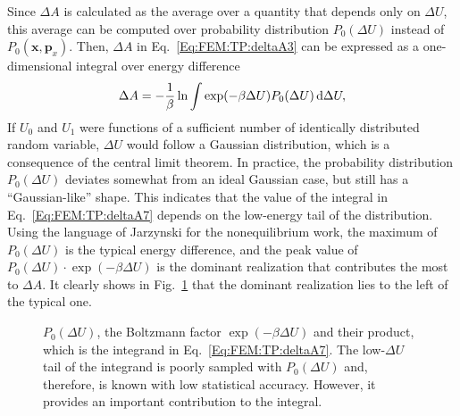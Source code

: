 Since $\Delta A$ is calculated as the average over a quantity that depends only on $\Delta U$, this average can be computed over probability distribution $P_0(\Delta U)$ instead of $P_{0}(\mathbf{x},\mathbf{p}_{x})$. Then, $\Delta A$ in Eq.~\ref{Eq:FEM:TP:deltaA3} can be expressed as a one-dimensional integral over energy difference
\begin{equation}
  \Delta A = -\frac{1}{\beta} \ln \int \exp(-\beta \Delta U) P_{0}(\Delta U) \mathop{}\!\mathrm{d}\Delta U,
  \label{Eq:FEM:TP:deltaA7}
\end{equation}
If $U_{0}$ and $U_{1}$ were functions of a sufficient number of identically distributed random variable, $\Delta U$ would follow a Gaussian distribution, which is a consequence of the central limit theorem. In practice, the probability distribution $P_{0}(\Delta U)$ deviates somewhat from an ideal Gaussian case, but still has a ``Gaussian-like'' shape. This indicates that the value of the integral in Eq.~\ref{Eq:FEM:TP:deltaA7} depends on the low-energy tail of the distribution. Using the language of Jarzynski for the nonequilibrium work\cite{JarzynskiPRE2006}, the maximum of $P_0(\Delta U)$ is the typical energy difference, and the peak value of $P_0(\Delta U)\cdot \exp{(-\beta \Delta U)}$ is the dominant realization that contributes the most to $\Delta A$. It clearly shows in Fig.~\ref{Fig:TP:Pdistribution} that the dominant realization lies to the left of the typical one.

\begin{figure}[htbp]
	\centering
	\caption{$P_{0}(\Delta U)$, the Boltzmann factor $\exp(-\beta \Delta U)$ and their product, which is the integrand in Eq.~\ref{Eq:FEM:TP:deltaA7}. The low-$\Delta U$ tail of the integrand is poorly sampled with $P_{0}(\Delta U)$ and, therefore, is known with low statistical accuracy. However, it provides an important contribution to the integral.}\label{Fig:TP:Pdistribution}
\end{figure}

